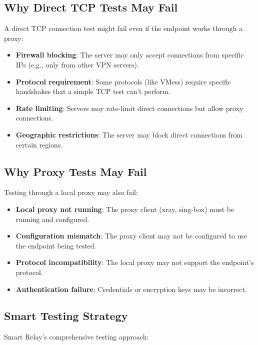\subsection{Why Direct TCP Tests May Fail}

A direct TCP connection test might fail even if the endpoint works through a proxy:

\begin{itemize}
    \item \textbf{Firewall blocking}: The server may only accept connections from specific IPs (e.g., only from other VPN servers).
    \item \textbf{Protocol requirement}: Some protocols (like VMess) require specific handshakes that a simple TCP test can't perform.
    \item \textbf{Rate limiting}: Servers may rate-limit direct connections but allow proxy connections.
    \item \textbf{Geographic restrictions}: The server may block direct connections from certain regions.
\end{itemize}

\subsection{Why Proxy Tests May Fail}

Testing through a local proxy may also fail:

\begin{itemize}
    \item \textbf{Local proxy not running}: The proxy client (xray, sing-box) must be running and configured.
    \item \textbf{Configuration mismatch}: The proxy client may not be configured to use the endpoint being tested.
    \item \textbf{Protocol incompatibility}: The local proxy may not support the endpoint's protocol.
    \item \textbf{Authentication failure}: Credentials or encryption keys may be incorrect.
\end{itemize}

\subsection{Smart Testing Strategy}

Smart Relay's comprehensive testing approach:

